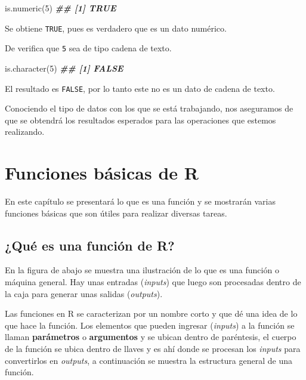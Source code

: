\documentclass[
]{book}
\newenvironment{Shaded}{\begin{snugshade}}{\end{snugshade}}
\newcommand{\DecValTok}[1]{\textcolor[rgb]{0.00,0.00,0.81}{#1}}
\newcommand{\DocumentationTok}[1]{\textcolor[rgb]{0.56,0.35,0.01}{\textbf{\textit{#1}}}}
\newcommand{\FunctionTok}[1]{\textcolor[rgb]{0.00,0.00,0.00}{#1}}
\newcommand{\NormalTok}[1]{#1}
\begin{document}
\begin{Shaded}
\begin{Highlighting}[]
\FunctionTok{is.numeric}\NormalTok{(}\DecValTok{5}\NormalTok{)}
\DocumentationTok{\#\# [1] TRUE}
\end{Highlighting}
\end{Shaded}

Se obtiene \texttt{TRUE}, pues es verdadero que es un dato numérico.

De verifica que \texttt{5} sea de tipo cadena de texto.

\begin{Shaded}
\begin{Highlighting}[]
\FunctionTok{is.character}\NormalTok{(}\DecValTok{5}\NormalTok{)}
\DocumentationTok{\#\# [1] FALSE}
\end{Highlighting}
\end{Shaded}

El resultado es \texttt{FALSE}, por lo tanto este no es un dato de cadena de texto.

Conociendo el tipo de datos con los que se está trabajando, nos aseguramos de que se obtendrá los resultados esperados para las operaciones que estemos realizando.

\hypertarget{funbasicas}{%
\chapter{Funciones básicas de R}\label{funbasicas}}

En este capítulo se presentará lo que es una función y se mostrarán varias funciones básicas que son útiles para realizar diversas tareas.

\hypertarget{quuxe9-es-una-funciuxf3n-de-r}{%
\section{¿Qué es una función de R?}\label{quuxe9-es-una-funciuxf3n-de-r}}

En la figura de abajo se muestra una ilustración de lo que es una función o máquina general. Hay unas entradas (\emph{inputs}) que luego son procesadas dentro de la caja para generar unas salidas (\emph{outputs}).

Las funciones en R se caracterizan por un nombre corto y que dé una idea de lo que hace la función. Los elementos que pueden ingresar (\emph{inputs}) a la función se llaman \textbf{parámetros} o \textbf{argumentos} y se ubican dentro de paréntesis, el cuerpo de la función se ubica dentro de llaves y es ahí donde se procesan los \emph{inputs} para convertirlos en \emph{outputs}, a continuación se muestra la estructura general de una función.
\end{document}
